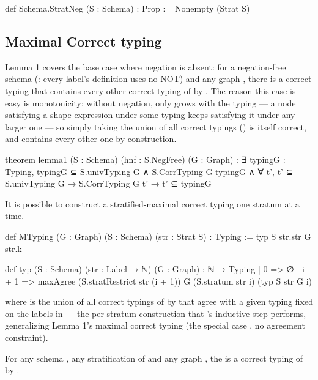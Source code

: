 \begin{leanlisting}
def Schema.StratNeg (S : Schema) : Prop := Nonempty (Strat S)
\end{leanlisting}

\subsection{Maximal Correct typing}

Lemma 1 covers the base case where negation is absent:
  for a negation-free schema  (:
  every label's definition uses no NOT) 
  and any graph , 
  there is a correct typing that contains every other correct 
  typing of  by . 
  The reason this case is easy is monotonicity: without negation, 
   only grows with the typing — 
  a node satisfying a shape expression under some typing keeps satisfying 
  it under any larger one — so simply taking the union of all correct typings () 
  is itself correct, 
  and contains every other one by construction. 

\begin{leanlisting}
theorem lemma1 (S : Schema) (hnf : S.NegFree) (G : Graph) :
    ∃ typingG : Typing, typingG ⊆ S.univTyping G ∧ S.CorrTyping G typingG ∧
      ∀ t', t' ⊆ S.univTyping G → S.CorrTyping G t' → t' ⊆ typingG
\end{leanlisting}

It is possible to construct a stratified-maximal correct typing 
  one stratum at a time. 

\begin{leanlisting}
def MTyping (G : Graph) (S : Schema) (str : Strat S) : Typing :=
  typ S str.str G str.k

def typ (S : Schema) (str : Label → ℕ) (G : Graph) : ℕ → Typing
  | 0 => ∅
  | i + 1 => maxAgree (S.stratRestrict str (i + 1)) G
                      (S.stratum str i) (typ S str G i)
\end{leanlisting}

where  is the union of all correct typings 
 of  by  that agree with a given typing fixed on the labels in  — 
 the per-stratum construction that 's inductive step performs, 
 generalizing Lemma 1's maximal correct typing (the special case , 
 no agreement constraint).

For any schema , any stratification  of 
and any graph , the 
is a correct typing of  by .

